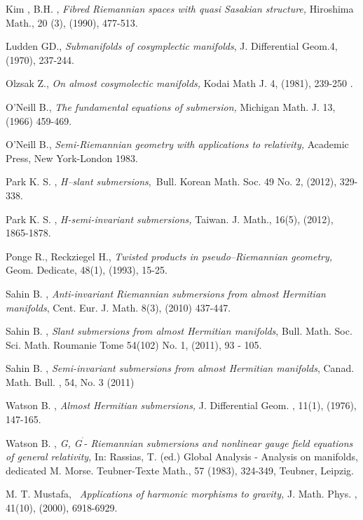 \documentclass{amsart}
\theoremstyle{plain}
\numberwithin{equation}{section}
\begin{document}
\begin{thebibliography}{99}
 {\small Kim , B.H. ,} {\small \emph{Fibred Riemannian spaces
with quasi Sasakian structure,}} {\small Hiroshima Math., 20 (3), (1990),
477-513.}

 {\small Ludden GD., \emph{Submanifolds of cosymplectic
manifolds}}, {\small J. Differential Geom.4, (1970), 237-244.}

 {\small Olzsak Z., \emph{On almost cosymolectic manifolds,}
Kodai Math J. 4, (1981), 239-250 .}

 {\small O'Neill B., \emph{The fundamental equations of
submersion,} Michigan Math. J. 13, (1966) 459-469.}

 {\small O'Neill B., \emph{Semi-Riemannian geometry with
applications to relativity,} Academic Press, New York-London 1983.}

 {\small Park K. S. ,} {\small \emph{H--slant submersions}},{\small \ Bull. Korean Math. Soc. 49 No. 2, (2012), 329-338.}

 {\small Park K. S. ,} {\small \emph{H-semi-invariant
submersions,}} {\small Taiwan. J. Math., 16(5), (2012), 1865-1878.}

 {\small Ponge R., Reckziegel H., \emph{Twisted products in
pseudo--Riemannian geometry, }Geom. Dedicate, 48(1), (1993), 15-25.}

 {\small Sahin B. ,} {\small \emph{Anti-invariant Riemannian
submersions from almost Hermitian manifolds}}, {\small Cent. Eur. J. Math.
8(3), (2010) 437-447.}

 {\small Sahin B. ,} {\small \emph{Slant submersions from
almost Hermitian manifolds}}, {\small Bull. Math. Soc. Sci. Math. Roumanie
Tome 54(102) No. 1, (2011), 93 - 105.}

 {\small Sahin B. , \emph{Semi-invariant submersions from
almost Hermitian manifolds}}, {\small Canad. Math. Bull. , 54, No. 3 (2011)}

 {\small Watson B. ,} {\small \emph{Almost Hermitian
submersions,}} {\small J. Differential Geom. , 11(1), (1976), 147-165.}

 {\small Watson B. , \emph{G, G}}$^{^{\prime }}$-{\small 
\emph{Riemannian submersions and nonlinear gauge field equations of general
relativity,}} {\small In: Rassias, T. (ed.) Global Analysis -} {\small Analysis on manifolds, dedicated M. Morse. Teubner-Texte Math., 57 (1983),
324-349, Teubner, Leipzig.}

 {\small M. T. Mustafa, \emph{\ Applications of harmonic
morphisms to gravity,} J. Math. Phys. , 41(10), (2000), 6918-6929.}
\end{thebibliography}
\end{document}
